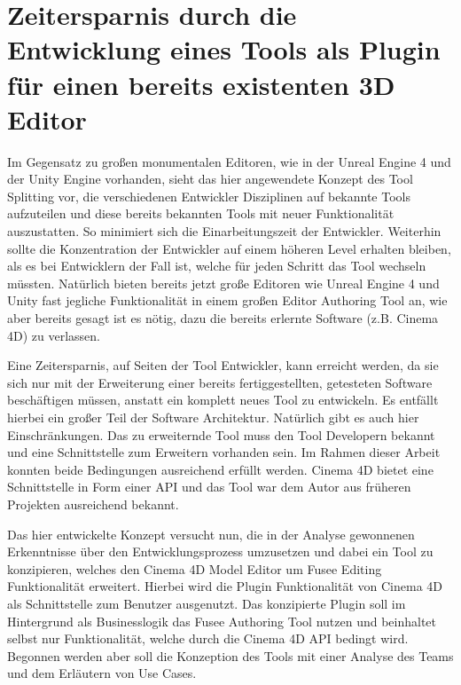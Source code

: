 \documentclass[pagesize, paper=a4, fontsize=12pt, titlepage=true, headings=small, headnosepline, abstractoff, liststotoc, nochapterprefix, plainheadsepline, twoside]{scrreprt}
\begin{document}
\section{Zeitersparnis durch die Entwicklung eines Tools als Plugin für einen bereits existenten 3D Editor}
Im Gegensatz zu großen monumentalen Editoren, wie in der Unreal Engine 4 und der Unity Engine vorhanden, sieht das hier angewendete Konzept des Tool Splitting vor, die verschiedenen Entwickler Disziplinen auf bekannte Tools aufzuteilen und diese bereits bekannten Tools mit neuer Funktionalität auszustatten. So minimiert sich die Einarbeitungszeit der Entwickler. Weiterhin sollte die Konzentration der Entwickler auf einem höheren Level erhalten bleiben, als es bei Entwicklern der Fall ist, welche für jeden Schritt das Tool wechseln müssten. Natürlich bieten bereits jetzt große Editoren wie Unreal Engine 4 und Unity fast jegliche Funktionalität in einem großen Editor Authoring Tool an, wie aber bereits gesagt ist es nötig, dazu die bereits erlernte Software (z.B. Cinema 4D) zu verlassen.

Eine Zeitersparnis, auf Seiten der Tool Entwickler, kann erreicht werden, da sie sich nur mit der Erweiterung einer bereits fertiggestellten, getesteten Software beschäftigen müssen, anstatt ein komplett neues Tool zu entwickeln. Es entfällt hierbei ein großer Teil der Software Architektur. Natürlich gibt es auch hier Einschränkungen. Das zu erweiternde Tool muss den Tool Developern bekannt und eine Schnittstelle zum Erweitern vorhanden sein. Im Rahmen dieser Arbeit konnten beide Bedingungen ausreichend erfüllt werden. Cinema 4D bietet eine Schnittstelle in Form einer API und das Tool war dem Autor aus früheren Projekten ausreichend bekannt.

Das hier entwickelte Konzept versucht nun, die in der Analyse gewonnenen Erkenntnisse über den Entwicklungsprozess umzusetzen und dabei ein Tool zu konzipieren, welches den Cinema 4D Model Editor um Fusee Editing Funktionalität erweitert. Hierbei wird die Plugin Funktionalität von Cinema 4D als Schnittstelle zum Benutzer ausgenutzt. Das konzipierte Plugin soll im Hintergrund als Businesslogik das Fusee Authoring Tool nutzen und beinhaltet selbst nur Funktionalität, welche durch die Cinema 4D API bedingt wird. Begonnen werden aber soll die Konzeption des Tools mit einer Analyse des Teams und dem Erläutern von Use Cases.
\end{document}
